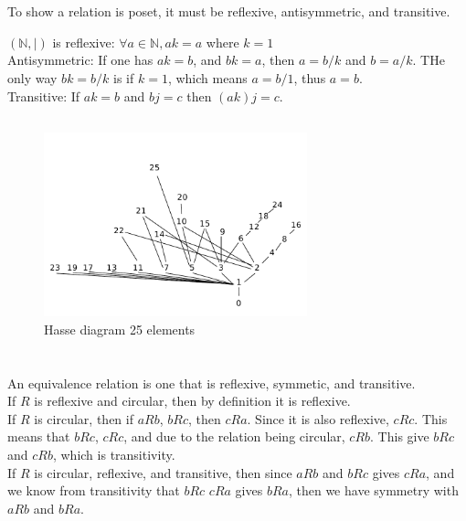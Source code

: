 \documentclass[10pt,reqno,sumlimits]{amsart}
\theoremstyle{plain}
\theoremstyle{definition}
\newcommand{\1}{{\bf 1}}
\numberwithin{equation}{section}
\begin{document}
\section{}


\section{}
\subsection{}
To show a relation is poset, it must be reflexive, antisymmetric, and transitive.

$(\mathbb{N}, |)$ is reflexive: $\forall a \in \mathbb{N}, ak = a$ where $k = 1$\\
Antisymmetric: If one has $ak = b$, and $bk = a$, then $a = b/k$ and $b = a/k$. THe only way $bk=b/k$ is if $k = 1$, which means $a = b/1$, thus $a = b$.\\
Transitive: If $ak=b$ and $bj= c$ then $(ak)j = c$.

\subsection{}
\begin{figure}[htbp]
\centerline{
    \mbox{\includegraphics[width=3.0in]{5_b.pdf}}
  }
  \caption{Hasse diagram 25 elements}
\end{figure}

\section{}
An equivalence relation is one that is reflexive, symmetic, and transitive.\\
If $R$ is reflexive and circular, then by definition it is reflexive.\\
If $R$ is circular, then if $aRb$, $bRc$, then $cRa$. Since it is also reflexive, $cRc$. This means that $bRc$, $cRc$, and due to the relation being circular, $cRb$. This give $bRc$ and $cRb$, which is transitivity.\\
If $R$ is circular, reflexive, and transitive, then since $aRb$ and $bRc$ gives $cRa$, and we know from transitivity that $bRc$ $cRa$ gives $bRa$, then we have symmetry with $aRb$ and $bRa$.\\
\end{document}
